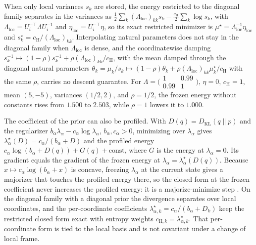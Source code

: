 \documentclass[twoside,11pt]{article}
\begin{document}
When only local variances $s_k$ are stored, the energy restricted to the diagonal family separates in the variances as $\tfrac12\sum_k(\Lambda_{\mathrm{loc}})_{kk}s_k-\tfrac{c_{\mathrm H}}2\sum_k\log s_k$, with $\Lambda_{\mathrm{loc}}=U_i^{-\top}\Lambda U_i^{-1}$ and $\eta_{\mathrm{loc}}=U_i^{-\top}\eta$, so its exact restricted minimizer is $\mu^\star=\Lambda_{\mathrm{loc}}^{-1}\eta_{\mathrm{loc}}$ and $s_k^\star=c_{\mathrm H}/(\Lambda_{\mathrm{loc}})_{kk}$. Interpolating natural parameters does not stay in the diagonal family when $\Lambda_{\mathrm{loc}}$ is dense, and the coordinatewise damping $s_k^{-1}\mapsto(1-\rho)s_k^{-1}+\rho(\Lambda_{\mathrm{loc}})_{kk}/c_{\mathrm H}$, with the mean damped through the diagonal natural parameters $\theta_k=\mu_k/s_k\mapsto(1-\rho)\theta_k+\rho(\Lambda_{\mathrm{loc}})_{kk}\mu^\star_k/c_{\mathrm H}$ with the same $\rho$, carries no descent guarantee. For $\Lambda=\bigl(\begin{smallmatrix}1&0.99\\0.99&1\end{smallmatrix}\bigr)$, $\eta=0$, $c_{\mathrm H}=1$, mean $(5,-5)$, variances $(1/2,2)$, and $\rho=1/2$, the frozen energy without constants rises from $1.500$ to $2.503$, while $\rho=1$ lowers it to $1.000$.

The coefficient of the prior can also be profiled. With $D(q)=D_{\mathrm{KL}}(q\|p)$ and the regularizer $b_\alpha\lambda_\alpha-c_\alpha\log\lambda_\alpha$, $b_\alpha,c_\alpha>0$, minimizing over $\lambda_\alpha$ gives $\lambda_\alpha^\star(D)=c_\alpha/(b_\alpha+D)$ and the profiled energy $c_\alpha\log(b_\alpha+D(q))+G(q)+\mathrm{const}$, where $G$ is the energy at $\lambda_\alpha=0$. Its gradient equals the gradient of the frozen energy at $\lambda_\alpha=\lambda_\alpha^\star(D(q))$. Because $x\mapsto c_\alpha\log(b_\alpha+x)$ is concave, freezing $\lambda_\alpha$ at the current state gives a majorizer that touches the profiled energy there, so the closed form at the frozen coefficient never increases the profiled energy: it is a majorize-minimize step \citep{HunterLange2004}. On the diagonal family with a diagonal prior the divergence separates over local coordinates, and the per-coordinate coefficients $\lambda_{\alpha,k}^\star=c_\alpha/(b_\alpha+D_k)$ keep the restricted closed form exact with entropy weights $c_{\mathrm H,k}=\lambda_{\alpha,k}^\star$. That per-coordinate form is tied to the local basis and is not covariant under a change of local frame.
\end{document}

